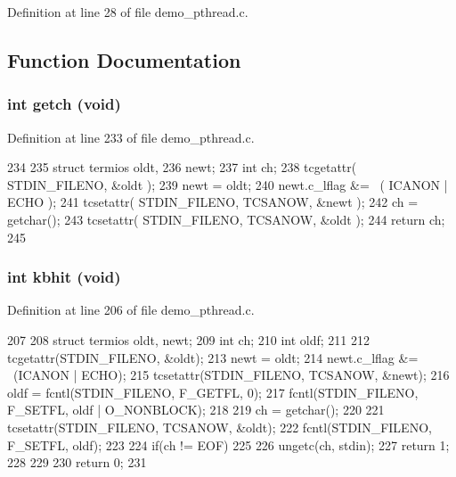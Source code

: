 Definition at line 28 of file demo\_\-pthread.c.

\subsection{Function Documentation}
\subsubsection[{getch}]{\setlength{\rightskip}{0pt plus 5cm}int getch (void)}\label{demo__pthread_8c_af5978fab9fa6dd4ced1c3a8ab1251f7b}


Definition at line 233 of file demo\_\-pthread.c.


\begin{DoxyCode}
234 {
235         struct termios oldt,
236         newt;
237         int ch;
238         tcgetattr( STDIN_FILENO, &oldt );
239         newt = oldt;
240         newt.c_lflag &= ~( ICANON | ECHO );
241         tcsetattr( STDIN_FILENO, TCSANOW, &newt );
242         ch = getchar();
243         tcsetattr( STDIN_FILENO, TCSANOW, &oldt );
244         return ch;
245 }
\end{DoxyCode}
\subsubsection[{kbhit}]{\setlength{\rightskip}{0pt plus 5cm}int kbhit (void)}\label{demo__pthread_8c_a97e9b1fe8d4c010474637a654aad6566}


Definition at line 206 of file demo\_\-pthread.c.


\begin{DoxyCode}
207 {
208         struct termios oldt, newt;
209         int ch;
210         int oldf;
211 
212         tcgetattr(STDIN_FILENO, &oldt);
213         newt = oldt;
214         newt.c_lflag &= ~(ICANON | ECHO);
215         tcsetattr(STDIN_FILENO, TCSANOW, &newt);
216         oldf = fcntl(STDIN_FILENO, F_GETFL, 0);
217         fcntl(STDIN_FILENO, F_SETFL, oldf | O_NONBLOCK);
218 
219         ch = getchar();
220 
221         tcsetattr(STDIN_FILENO, TCSANOW, &oldt);
222         fcntl(STDIN_FILENO, F_SETFL, oldf);
223 
224         if(ch != EOF)
225         {
226         ungetc(ch, stdin);
227         return 1;
228         }
229 
230         return 0;
231 }
\end{DoxyCode}
